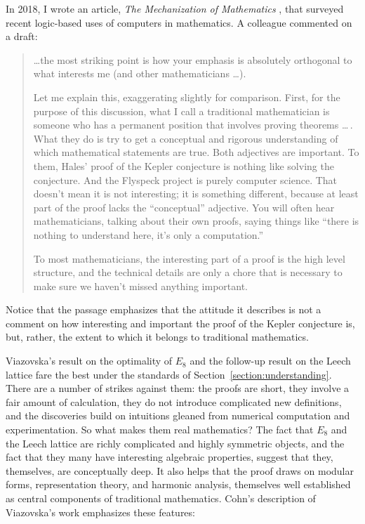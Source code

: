 \documentclass{amsart}
\theoremstyle{definition}
\theoremstyle{remark}
\numberwithin{equation}{section}
\begin{document}
In 2018, I wrote an article, \emph{The Mechanization of Mathematics} \cite{avigad:18}, that surveyed recent logic-based uses of computers in mathematics. A colleague commented on a draft:
\begin{quote}
\ldots the most striking point is how your emphasis is absolutely orthogonal to what interests me (and other mathematicians \ldots).

Let me explain this, exaggerating slightly for comparison. First, for the purpose of this discussion, what I call a traditional mathematician is someone who has a permanent position that involves proving theorems
\ldots\,. What they do is try to get a conceptual and rigorous understanding of which mathematical statements are true. Both adjectives are important. To them, Hales' proof of the Kepler conjecture is nothing like solving the conjecture. And the Flyspeck project is purely computer science. That doesn't mean it is not interesting; it is something different, because at least part of the proof lacks the ``conceptual'' adjective. You will often hear mathematicians, talking about their own proofs, saying things like ``there is nothing to understand here, it's only a computation.''

To most mathematicians, the interesting part of a proof is the high level structure, and the technical details are only a chore that is necessary to make sure we haven't missed anything important.
\end{quote}
Notice that the passage emphasizes that the attitude it describes is not a comment on how interesting and important the proof of the Kepler conjecture is, but, rather, the extent to which it belongs to traditional mathematics.

Viazovska's result on the optimality of $E_8$ and the follow-up result on the Leech lattice fare the best under the standards of Section~\ref{section:understanding}. There are a number of strikes against them: the proofs are short, they involve a fair amount of calculation, they do not introduce complicated new definitions, and the discoveries build on intuitions gleaned from numerical computation and experimentation. So what makes them real mathematics? The fact that $E_8$ and the Leech lattice are richly complicated and highly symmetric objects, and the fact that they many have interesting algebraic properties, suggest that they, themselves, are conceptually deep. It also helps that the proof draws on modular forms, representation theory, and harmonic analysis, themselves well established as central components of traditional mathematics. Cohn's description of Viazovska's work emphasizes these features:
\end{document}
